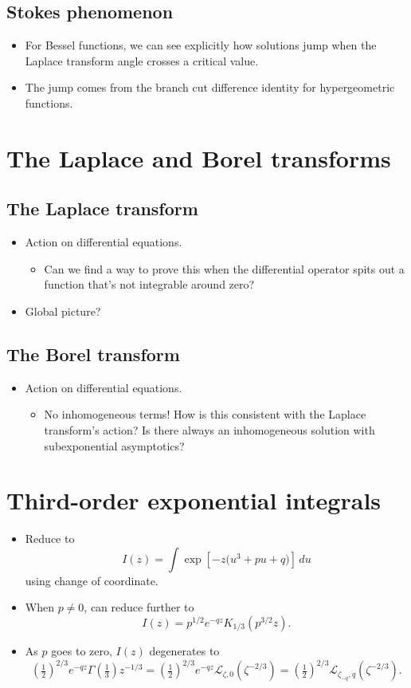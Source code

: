 \documentclass{article}
\newcommand{\laplace}{\mathcal{L}}
\begin{document}
\subsection{Stokes phenomenon}
\begin{itemize}
\item For Bessel functions, we can see explicitly how solutions jump when the Laplace transform angle crosses a critical value.
\item The jump comes from the branch cut difference identity for hypergeometric functions.
\end{itemize}
\section{The Laplace and Borel transforms}
\subsection{The Laplace transform}
\begin{itemize}
\item Action on differential equations.
\begin{itemize}
\item Can we find a way to prove this when the differential operator spits out a function that's not integrable around zero?
\end{itemize}
\item Global picture?
\end{itemize}
\subsection{The Borel transform}
\begin{itemize}
\item Action on differential equations.
\begin{itemize}
\item No inhomogeneous terms! How is this consistent with the Laplace transform's action? Is there always an inhomogeneous solution with subexponential asymptotics?
\end{itemize}
\end{itemize}
\section{Third-order exponential integrals}
\begin{itemize}
\item Reduce to
\[ I(z) = \int \exp\left[-z\big(u^3 + pu + q)\right]\,du \]
using change of coordinate.
\item When $p \neq 0$, can reduce further to
\[ I(z) = p^{1/2} e^{-qz} K_{1/3}(p^{3/2} z). \]
\item As $p$ goes to zero, $I(z)$ degenerates to
\[ \left(\tfrac{1}{2}\right)^{2/3} e^{-qz} \Gamma(\tfrac{1}{3}) z^{-1/3} = \left(\tfrac{1}{2}\right)^{2/3} e^{-qz} \laplace_{\zeta,0}(\zeta^{-2/3}) = \left(\tfrac{1}{2}\right)^{2/3} \laplace_{\zeta_{-q},q}(\zeta^{-2/3}). \]
\end{itemize}
\end{document}
